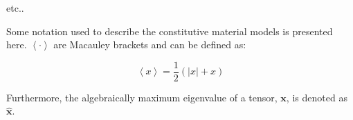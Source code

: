 etc..

Some notation used to describe the constitutive material models is presented here. $\left\langle \cdotp\right\rangle $ are Macauley brackets and can be defined as:

\begin{equation}
\left\langle x\right\rangle =\frac{1}{2}\left(\left|x\right|+x\right)\label{eqn:const9-3}
\end{equation}

Furthermore, the algebraically maximum eigenvalue of a tensor, $\mathbf{x}$, is denoted as $\hat{\mathbf{x}}$.



